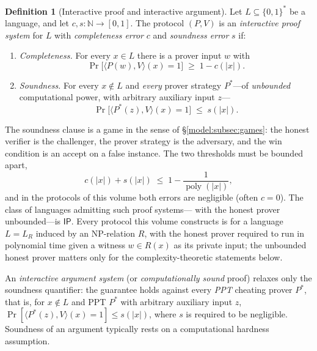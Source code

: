 \documentclass[11pt,a4paper]{article}
\theoremstyle{definition}
\newtheorem{definition}[theorem]{Definition}
\theoremstyle{remark}
\newcommand{\N}{\ensuremath{\mathbb{N}}}
\DeclareMathOperator{\poly}{poly}
\providecommand{\abs}[1]{\lvert #1 \rvert}
\begin{document}
\begin{definition}[Interactive proof and interactive argument]
\label{zk:def:proofargument}
Let \(L \subseteq \{0,1\}^{*}\) be a language, and let
\(c, s \colon \N \to [0, 1]\). The protocol \((P, V)\) is an
\emph{interactive proof system} for \(L\) with \emph{completeness
error} \(c\) and \emph{soundness error} \(s\) if:
\begin{enumerate}
\item \emph{Completeness.} For every \(x \in L\) there is a prover
  input \(w\) with
  \[
  \Pr\bigl[\langle P(w), V \rangle(x) = 1\bigr]
  \;\ge\; 1 - c(\abs{x}).
  \]
\item \emph{Soundness.} For every \(x \notin L\) and \emph{every}
  prover strategy \(P^{*}\)---of \emph{unbounded} computational
  power, with arbitrary auxiliary input \(z\)---
  \[
  \Pr\bigl[\langle P^{*}(z), V \rangle(x) = 1\bigr]
  \;\le\; s(\abs{x}).
  \]
\end{enumerate}
The soundness clause is a game in the sense of
\S\ref{model:subsec:games}: the honest verifier is the challenger,
the prover strategy is the adversary, and the win condition is an
accept on a false instance. The two thresholds must be bounded apart,
\[
c(\abs{x}) + s(\abs{x}) \;\le\; 1 - \frac{1}{\poly(\abs{x})},
\]
and in the protocols of this volume both errors are negligible (often
\(c = 0\)). The class of languages admitting such proof systems---
with the honest prover unbounded---is \(\mathsf{IP}\). Every
protocol this volume constructs is for a language \(L = L_R\)
induced by an NP-relation \(R\), with the honest prover required to
run in polynomial time given a witness \(w \in R(x)\) as its private
input; the unbounded honest prover matters only for the
complexity-theoretic statements below.

An \emph{interactive argument system} (or \emph{computationally
sound} proof) relaxes only the soundness quantifier: the guarantee
holds against every \emph{PPT} cheating prover \(P^{*}\), that is,
for \(x \notin L\) and PPT \(P^{*}\) with arbitrary auxiliary input
\(z\), \(\Pr[\langle P^{*}(z), V \rangle(x) = 1] \le s(\abs{x})\),
where \(s\) is required to be negligible. Soundness of an argument
typically rests on a computational hardness assumption.
\end{definition}
\end{document}
